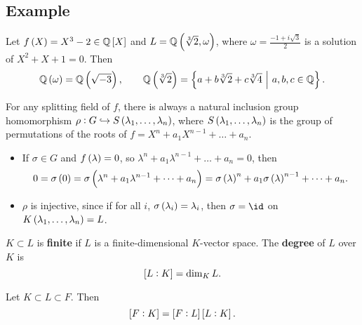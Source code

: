 \subsection{Example}

Let $ f\br{X} = X^3 - 2 \in \QQ\sbr{X} $ and $ L = \QQ\br{\sqrt[3]{2}, \omega} $, where $ \omega = \tfrac{-1 + i\sqrt{3}}{2} $ is a solution of $ X^2 + X + 1 = 0 $. Then
$$ \QQ\br{\omega} = \QQ\br{\sqrt{-3}}, \qquad \QQ\br{\sqrt[3]{2}} = \cbr{a + b\sqrt[3]{2} + c\sqrt[3]{4} \st a, b, c \in \QQ}. $$

\begin{remark*}
For any splitting field of $ f $, there is always a natural inclusion group homomorphism $ \rho : G \hookrightarrow S\br{\lambda_1, \dots, \lambda_n} $, where $ S\br{\lambda_1, \dots, \lambda_n} $ is the group of permutations of the roots of $ f = X^n + a_1X^{n - 1} + \dots + a_n $.
\begin{itemize}
\item If $ \sigma \in G $ and $ f\br{\lambda} = 0 $, so $ \lambda^n + a_1\lambda^{n - 1} + \dots + a_n = 0 $, then
$$ 0 = \sigma\br{0} = \sigma\br{\lambda^n + a_1\lambda^{n - 1} + \dots + a_n} = \sigma\br{\lambda}^n + a_1\sigma\br{\lambda}^{n - 1} + \dots + a_n. $$
\item $ \rho $ is injective, since if for all $ i $, $ \sigma\br{\lambda_i} = \lambda_i $, then $ \sigma = \id $ on $ K\br{\lambda_1, \dots, \lambda_n} = L $.
\end{itemize}
\end{remark*}


\begin{definition}
$ K \subset L $ is \textbf{finite} if $ L $ is a finite-dimensional $ K $-vector space. The \textbf{degree} of $ L $ over $ K $ is
$$ \sbr{L : K} = \dim_K L. $$
\end{definition}

\begin{theorem}
Let $ K \subset L \subset F $. Then
$$ \sbr{F : K} = \sbr{F : L}\sbr{L : K}. $$
\end{theorem}

